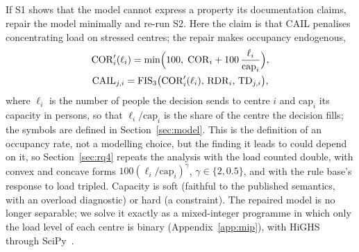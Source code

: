\documentclass[systems,article,accept,moreauthors,pdftex]{Definitions/mdpi}
\begin{document}
\subsection{ %
}
If S1 shows that the model cannot express a property its documentation claims, repair the
model minimally and re-run S2. Here the claim is that CAIL penalises concentrating load on
stressed centres; the repair makes occupancy endogenous,
\begin{equation}
\begin{gathered}
\mathrm{COR}'_i(\ell_i) = \min\Bigl(100,\; \mathrm{COR}_i + 100\,\frac{\ell_i}{\mathrm{cap}_i}\Bigr),\\
\mathrm{CAIL}_{j,i} = \mathrm{FIS}_3\bigl(\mathrm{COR}'_i(\ell_i),\, \mathrm{RDR}_i,\, \mathrm{TD}_{j,i}\bigr),
\end{gathered}
\label{eq:repair}
\end{equation}
where $\ell_i$ is the number of people the decision sends to centre $i$ and
$\mathrm{cap}_i$ its capacity in persons, so that $\ell_i/\mathrm{cap}_i$ is the share of the
centre the decision fills; the symbols are defined in Section~\ref{sec:model}. This is the
definition of an occupancy rate, not a modelling choice, but the finding it leads to could
depend on it, so Section~\ref{sec:rq4} repeats the analysis with the load counted double, with
convex and concave forms $100(\ell_i/\mathrm{cap}_i)^{\gamma}$, $\gamma \in \{2, 0.5\}$, and with
the rule base's response to load tripled. Capacity is soft (faithful to the published semantics,
with an overload diagnostic) or hard (a constraint). The repaired model is no longer separable;
we solve it exactly as a mixed-integer programme in which only the load level of each centre is
binary (Appendix~\ref{app:mip}), with HiGHS~\cite{huangfu2018highs} through
SciPy~\cite{virtanen2020scipy}.
\end{document}
